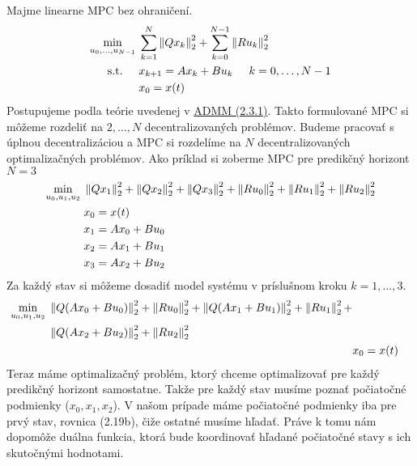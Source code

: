 Majme linearne MPC bez ohraničení.
\label{math:2.17}
\begin{subequations}
	\begin{align}
		\displaystyle \min_{u_0,...,u_{N-1}} \hspace{0.1cm} & 
		\sum_{k=1}^{N}\left\lVert Qx_k\right\rVert^{2}_{2}+\sum_{k=0}^{N-1}\left\lVert Ru_k\right\rVert^{2}_{2}\\
		\textrm{s.t.} \hspace{0.5cm} & x_{k+1} = Ax_{k}+Bu_{k}\hspace{0.5cm} k=0,\dots,N-1\\
		& x_{0} = x(t)
	\end{align}
\end{subequations}
Postupujeme podla teórie uvedenej v \hyperref[subse:ADMM]{ADMM (2.3.1)}. Takto formulované MPC si môžeme rozdeliť na $2,\dots,N$ decentralizovaných problémov. Budeme pracovať s úplnou decentralizáciou a MPC si rozdelíme na $N$ decentralizovaných optimalizačných problémov.
\label{math:ADMM_MPC}
Ako príklad si zoberme MPC pre predikčný horizont $N = 3$
\begin{subequations}
	\begin{align}
		\displaystyle\min_{u_0,u_1,u_2}\hspace{0.1cm}&\left\lVert Qx_1\right\rVert^{2}_{2}+\left\lVert Qx_2\right\rVert^{2}_{2}+\left\lVert Qx_3\right\rVert^{2}_{2}+\left\lVert Ru_0\right\rVert^{2}_{2}+\left\lVert Ru_1\right\rVert^{2}_{2}+\left\lVert Ru_2\right\rVert^{2}_{2}\\
		& x_{0} = x(t)\\
		&x_{1} = Ax_{0}+Bu_{0}\\
		&x_{2} = Ax_{1}+Bu_{1}\\
		&x_{3} = Ax_{2}+Bu_{2}
	\end{align}
\end{subequations}
Za každý stav si môžeme dosadiť model systému v príslušnom kroku $k=1,\dots,3$. 
\begin{subequations}
	\begin{align}	
	\begin{split}			
			\displaystyle\min_{u_0,u_1,u_2}\hspace{0.1cm}&\left\lVert Q(Ax_{0}+Bu_{0})\right\rVert^{2}_{2}+\left\lVert Ru_0\right\rVert^{2}_{2}+\left\lVert Q(Ax_{1}+Bu_{1})\right\rVert^{2}_{2}+\left\lVert Ru_1\right\rVert^{2}_{2}+\\
			&\left\lVert Q(Ax_{2}+Bu_{2})\right\rVert^{2}_{2}+\left\lVert Ru_2\right\rVert^{2}_{2}	
	\end{split}\\
	& x_{0} = x(t)
	\end{align}
\end{subequations}
Teraz máme optimalizačný problém, ktorý chceme optimalizovať pre každý predikčný horizont samostatne. Takže pre každý stav musíme poznať počiatočné podmienky ($x_0,x_1,x_2$). V našom prípade máme počiatočné podmienky iba pre prvý stav, rovnica (2.19b), čiže ostatné musíme hľadať. Práve k tomu nám dopomôže duálna funkcia, ktorá bude koordinovať hľadané počiatočné stavy s ich skutočnými hodnotami. 

